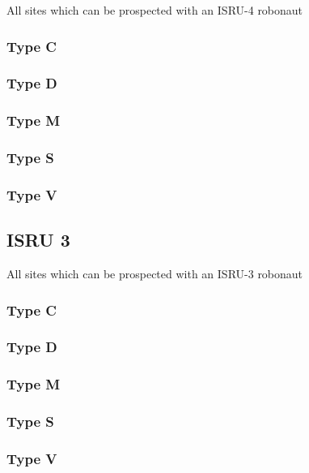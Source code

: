 \documentclass[a4paper,table,fontsize=8pt,DIV=6,enabledeprecatedfontcommands]{scrbook}
\begin{document}
All sites which can be prospected with an ISRU-4 robonaut
\subsubsection{Type C}
\subsubsection{Type D}
\subsubsection{Type M}
\subsubsection{Type S}
\subsubsection{Type V}

\subsection{ISRU 3}
All sites which can be prospected with an ISRU-3 robonaut
\subsubsection{Type C}
\pagebreak
\subsubsection{Type D}
\subsubsection{Type M}
\subsubsection{Type S}
\subsubsection{Type V}
\end{document}
